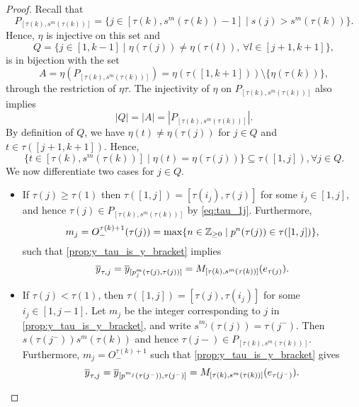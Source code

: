 \begin{proof}
	Recall that
	\begin{equation*}
		P_{[\tau(k), s^m(\tau(k))]} = \{j \in [\tau(k), s^m(\tau(k)) -1] \mid s(j) > s^m(\tau(k))\}.
	\end{equation*}
	Hence, $\eta$ is injective on this set and
	\begin{equation*}
		Q = \{j \in [1, k-1] \mid \eta(\tau(j)) \neq \eta(\tau(l)),\, \forall l \in [j+1, k+1]\},
	\end{equation*}
	is in bijection with the set
	\begin{equation*}
		A = \eta(P_{[\tau(k), s^m(\tau(k))]}) = \eta(\tau([1, k+1])) \setminus \{\eta(\tau(k))\},
	\end{equation*}
	through the restriction of $\eta \tau$. The injectivity of $\eta$ on $P_{[\tau(k),
						s^m(\tau(k))]}$ also implies
	\begin{equation*}
		|Q| = |A| = |P_{[\tau(k), s^m(\tau(k))]}|.
	\end{equation*}
	By definition of $Q$, we have $\eta(t) \neq \eta(\tau(j))$ for $j \in Q$ and $t \in
		\tau([j+1, k +1])$. Hence,
	\begin{equation}\label{eq:tau_1j}
		\{t \in [\tau(k), s^m(\tau(k))] \mid \eta(t) = \eta(\tau(j))\} \subseteq \tau([1, j]), \forall j \in Q.
	\end{equation}
	We now differentiate two cases for $j \in Q$.
	\begin{itemize}
		\item If $\tau(j) \geq \tau(1)$ then $\tau([1, j]) = [\tau(i_j), \tau(j)]$ for some $i_j \in
			      [1, j]$, and hence $\tau(j) \in P_{[\tau(k), s^m(\tau(k))]}$ by \cref{eq:tau_1j}.
		      Furthermore,
		      \begin{equation*}
			      m_j = O_{-}^{\tau(k) + 1}(\tau(j)) = \max\{n \in \mathbb{Z}_{\geq 0} \mid p^n (\tau(j)) \in \tau([1, j])\},
		      \end{equation*}
		      such that \cref{prop:y_tau_is_y_bracket} implies
		      \begin{equation*}
			      \overline{y}_{\tau, j} = \overline{y}_{[p^m_j(\tau(j), \tau(j))]} = M_{[\tau(k), s^m(\tau(k))]}(e_{\tau(j)}).
		      \end{equation*}
		\item If $\tau(j) < \tau(1)$, then $\tau([1, j]) = [\tau(j), \tau(i_j)]$ for some $i_j \in
			      [1, j-1]$. Let $m_j$ be the integer corresponding to $j$ in
		      \cref{prop:y_tau_is_y_bracket}, and write $s^{m_j}(\tau(j)) = \tau(j^{-})$. Then
		      $s(\tau(j^{-})) s^m(\tau(k))$ and hence $\tau(j-) \in P_{[\tau(k), s^m(\tau(k))]}$.
		      Furthermore, $m_j = O_{-}^{\tau(k) + 1}$ such that \cref{prop:y_tau_is_y_bracket} gives
		      \begin{equation*}
			      \overline{y}_{\tau, j} = \overline{y}_{[p^{m_j}(\tau(j^{-})), \tau(j^{-})]} = M_{[\tau(k), s^m(\tau(k))]}(e_{\tau(j^{-})}).
		      \end{equation*}
	\end{itemize}


\end{proof}
